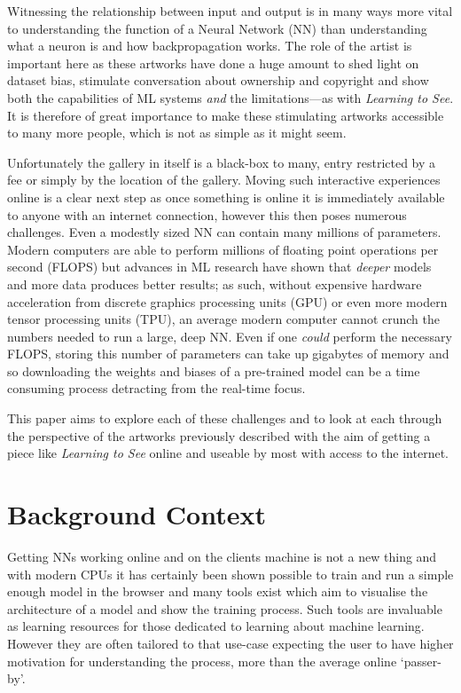 \documentclass{article}
\begin{document}
Witnessing the relationship between input and output is in many ways more vital to understanding the function of a Neural Network (NN) than understanding what a neuron is and how backpropagation works. The role of the artist is important here as these artworks have done a huge amount to shed light on dataset bias\cite{crawford_paglen_2019}, stimulate conversation about ownership and copyright\cite{romano_2016} and show both the capabilities of ML systems \textit{and} the limitations---as with \textit{Learning to See}. It is therefore of great importance to make these stimulating artworks accessible to many more people, which is not as simple as it might seem.

Unfortunately the gallery in itself is a black-box to many, entry restricted by a fee or simply by the location of the gallery. Moving such interactive experiences online is a clear next step as once something is online it is immediately available to anyone with an internet connection, however this then poses numerous challenges. Even a modestly sized NN can contain many millions of parameters. Modern computers are able to perform millions of floating point operations per second (FLOPS) but advances in ML research have shown that \textit{deeper} models and more data produces better results\cite{2005.14165}; as such, without expensive hardware acceleration from discrete graphics processing units (GPU) or even more modern tensor processing units (TPU), an average modern computer cannot crunch the numbers needed to run a large, deep NN\@. Even if one \textit{could} perform the necessary FLOPS, storing this number of parameters can take up gigabytes of memory and so downloading the weights and biases of a pre-trained model can be a time consuming process detracting from the real-time focus.

This paper aims to explore each of these challenges and to look at each through the perspective of the artworks previously described with the aim of getting a piece like \textit{Learning to See} online and useable by most with access to the internet.


\section{Background Context}

Getting NNs working online and on the clients machine is not a new thing and with modern CPUs it has certainly been shown possible to train and run a simple enough model in the browser\cite{karparthy_conjs_2016, brainjs, synaptic, mind, kerasjs} and many tools exist which aim to visualise the architecture of a model and show the training process\cite{broad_cnn_vis_2016, tensorflow_playground, 1704.01942}. Such tools are invaluable as learning resources for those dedicated to learning about machine learning. However they are often tailored to that use-case expecting the user to have higher motivation for understanding the process, more than the average online `passer-by'.
\end{document}
